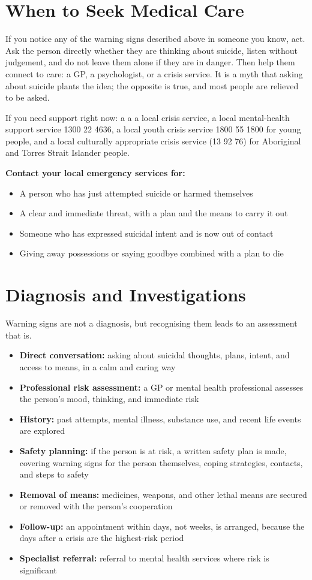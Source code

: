 \section*{When to Seek Medical Care}
If you notice any of the warning signs described above in someone you know, act. Ask the person directly whether they are thinking about suicide, listen without judgement, and do not leave them alone if they are in danger. Then help them connect to care: a GP, a psychologist, or a crisis service. It is a myth that asking about suicide plants the idea; the opposite is true, and most people are relieved to be asked.

If you need support right now: a a a local crisis service, a local mental-health support service 1300 22 4636, a local youth crisis service 1800 55 1800 for young people, and a local culturally appropriate crisis service (13 92 76) for Aboriginal and Torres Strait Islander people.

\textbf{Contact your local emergency services for:}
\begin{itemize}
    \item A person who has just attempted suicide or harmed themselves
    \item A clear and immediate threat, with a plan and the means to carry it out
    \item Someone who has expressed suicidal intent and is now out of contact
    \item Giving away possessions or saying goodbye combined with a plan to die
\end{itemize}

\section*{Diagnosis and Investigations}
Warning signs are not a diagnosis, but recognising them leads to an assessment that is.

\begin{itemize}
    \item \textbf{Direct conversation:} asking about suicidal thoughts, plans, intent, and access to means, in a calm and caring way
    \item \textbf{Professional risk assessment:} a GP or mental health professional assesses the person's mood, thinking, and immediate risk
    \item \textbf{History:} past attempts, mental illness, substance use, and recent life events are explored
    \item \textbf{Safety planning:} if the person is at risk, a written safety plan is made, covering warning signs for the person themselves, coping strategies, contacts, and steps to safety
    \item \textbf{Removal of means:} medicines, weapons, and other lethal means are secured or removed with the person's cooperation
    \item \textbf{Follow-up:} an appointment within days, not weeks, is arranged, because the days after a crisis are the highest-risk period
    \item \textbf{Specialist referral:} referral to mental health services where risk is significant
\end{itemize}

